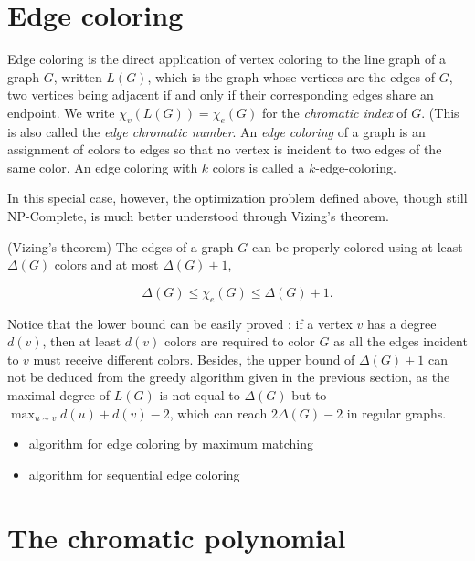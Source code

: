 
\section{Edge coloring}

Edge coloring is the direct application of vertex coloring to the 
line graph of a graph $G$, written $L(G)$, which is the graph whose 
vertices are the edges of $G$, two vertices being adjacent if and 
only if their corresponding edges share an endpoint. 
We write $\chi_v(L(G)) = \chi_e(G)$ for the {\it chromatic index} of $G$.
(This is also called the {\it edge chromatic number}.
An {\it edge coloring} of a graph is an assignment of colors to 
edges so that no vertex is
incident to two edges of the same color. An edge coloring with 
$k$ colors is called a $k$-edge-coloring. 

In this special case, however, the optimization problem defined 
above, though still NP-Complete, is much better understood through 
Vizing's theorem.

\begin{theorem}
(Vizing's theorem)
The edges of a graph $G$ can be properly colored using at least 
$\Delta(G)$ colors and at most $\Delta(G)+1$,

\[
\Delta(G)\leq \chi_e(G)\leq \Delta(G)+1.
\]
\end{theorem}

Notice that the lower bound can be easily proved : if a vertex 
$v$ has a degree $d(v)$, then at least $d(v)$ colors are required 
to color $G$ as all the edges incident to $v$ must receive 
different colors. Besides, the upper bound of $\Delta(G)+1$ 
can not be deduced from the greedy algorithm given in the 
previous section, as the maximal degree of $L(G)$ is not equal to 
$\Delta(G)$ but to $\displaystyle \max_{u\sim v}d(u)+d(v)-2$, which 
can reach $2\Delta(G)-2$ in regular graphs.


\begin{itemize}
\item algorithm for edge coloring by maximum matching
\item algorithm for sequential edge coloring
\end{itemize}



\section{The chromatic polynomial}

